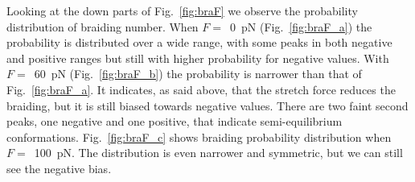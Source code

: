 \documentclass[a4paper,10pt]{article}
\begin{document}
Looking at the down parts of Fig.~\ref{fig:braF} we observe the probability distribution of braiding number.
When $F=$~\SI{0}{\pico\newton} (Fig.~\ref{fig:braF_a}) the probability is distributed over a wide range, with some peaks in both negative and positive ranges but still with higher probability for negative values.
With $F=$~\SI{60}{\pico\newton} (Fig.~\ref{fig:braF_b}) the probability is narrower than that of Fig.~\ref{fig:braF_a}.
It indicates, as said above, that the stretch force reduces the braiding, but it is still biased towards negative values.
There are two faint second peaks, one negative and one positive, that indicate semi-equilibrium conformations.
Fig.~\ref{fig:braF_c} shows braiding probability distribution when $F=$~\SI{100}{\pico\newton}.
The distribution is even narrower and symmetric, but we can still see the negative bias.
\end{document}
